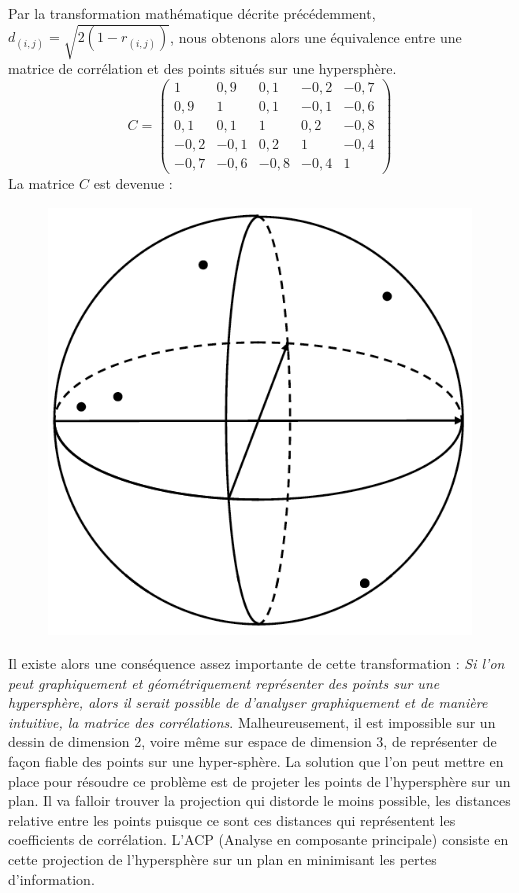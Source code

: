 Par la transformation mathématique décrite précédemment, $d_{(i,j)} = \sqrt{2(1-r_{(i,j)})}$, nous obtenons alors une équivalence entre une matrice de corrélation et des points situés sur une hypersphère. 
$$C = \begin{pmatrix} 
1 & 0,9 & 0,1 & - 0,2 & -0,7 \\
0,9 & 1 & 0,1 & -0,1 &-0,6 \\
0,1 & 0,1 & 1 & 0,2 & -0,8\\
-0,2 & -0,1 & 0,2 & 1 & -0,4 \\
-0,7 & -0,6 & -0,8 & -0,4 & 1
\end{pmatrix}$$
La matrice $C$ est devenue : 
\begin{figure}[H]\begin{center}\includegraphics[scale=0.35]{ilu/hyperNB.png}\end{center}\end{figure}

Il existe alors une conséquence assez importante de cette transformation : \textit{Si l'on peut graphiquement et géométriquement représenter des points sur une hypersphère, alors il serait possible de d'analyser graphiquement et de manière intuitive, la matrice des corrélations}. Malheureusement, il est impossible sur un dessin de dimension 2, voire même sur espace de dimension 3, de représenter de façon fiable des points sur une hyper-sphère.\newline
La solution que l'on peut mettre en place pour résoudre ce problème est de projeter les points de l'hypersphère sur un plan. Il va falloir trouver la projection qui distorde le moins possible, les distances relative entre les points puisque ce sont ces distances qui représentent les coefficients de corrélation. L'ACP (Analyse en composante principale) consiste en cette projection de l'hypersphère sur un plan en minimisant les pertes d'information. 

